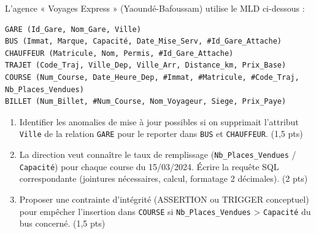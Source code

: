 \documentclass[11pt]{article}
\begin{document}
\begin{exercice}
L'agence « Voyages Express » (Yaoundé-Bafoussam) utilise le MLD ci-dessous :
\begin{verbatim}
GARE (Id_Gare, Nom_Gare, Ville)
BUS (Immat, Marque, Capacité, Date_Mise_Serv, #Id_Gare_Attache)
CHAUFFEUR (Matricule, Nom, Permis, #Id_Gare_Attache)
TRAJET (Code_Traj, Ville_Dep, Ville_Arr, Distance_km, Prix_Base)
COURSE (Num_Course, Date_Heure_Dep, #Immat, #Matricule, #Code_Traj, Nb_Places_Vendues)
BILLET (Num_Billet, #Num_Course, Nom_Voyageur, Siege, Prix_Paye)
\end{verbatim}
\begin{enumerate}
    \item Identifier les anomalies de mise à jour possibles si on supprimait l'attribut \texttt{Ville} de la relation \texttt{GARE} pour le reporter dans \texttt{BUS} et \texttt{CHAUFFEUR}. (1,5 pts)
    \item La direction veut connaître le taux de remplissage (\texttt{Nb\_Places\_Vendues} / \texttt{Capacité}) pour chaque course du 15/03/2024. Écrire la requête SQL correspondante (jointures nécessaires, calcul, formatage 2 décimales). (2 pts)
    \item Proposer une contrainte d'intégrité (ASSERTION ou TRIGGER conceptuel) pour empêcher l'insertion dans \texttt{COURSE} si \texttt{Nb\_Places\_Vendues} > \texttt{Capacité} du bus concerné. (1,5 pts)
\end{enumerate}
\end{exercice}
\end{document}
